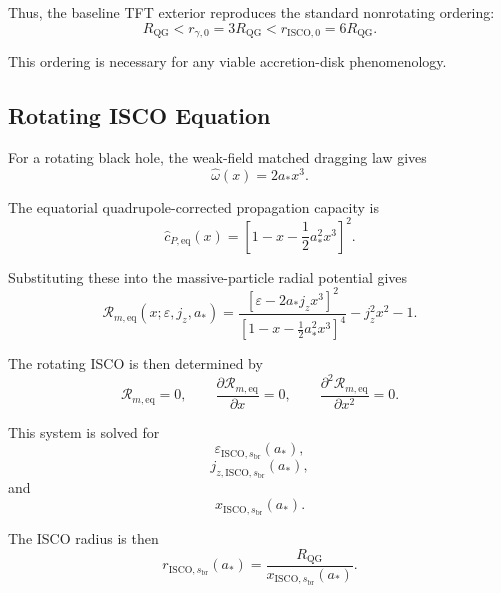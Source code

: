 Thus, the baseline TFT exterior reproduces the standard nonrotating ordering:
\begin{equation}
    \boxed{ R_{\mathrm{QG}} < r_{\gamma,0} = 3R_{\mathrm{QG}} < r_{\mathrm{ISCO},0} = 6R_{\mathrm{QG}}. }
\end{equation}

This ordering is necessary for any viable accretion-disk phenomenology.

\subsection{Rotating ISCO Equation}

For a rotating black hole, the weak-field matched dragging law gives
\begin{equation}
    \widehat{\omega}(x) = 2a_\ast x^3.
\end{equation}

The equatorial quadrupole-corrected propagation capacity is
\begin{equation}
    \widehat{c}_{P,\mathrm{eq}}(x) = \left[ 1 - x - \frac{1}{2}a_\ast^2x^3 \right]^2.
\end{equation}

Substituting these into the massive-particle radial potential gives
\begin{equation}
    \boxed{ \mathcal{R}_{m,\mathrm{eq}}(x;\varepsilon,j_z,a_\ast) = \frac{ \left[ \varepsilon - 2a_\ast j_z x^3 \right]^2 }{ \left[ 1 - x - \frac{1}{2}a_\ast^2x^3 \right]^4 } - j_z^2x^2 - 1. }
\end{equation}

The rotating ISCO is then determined by
\begin{equation}
    \boxed{ \mathcal{R}_{m,\mathrm{eq}} = 0, \qquad \frac{\partial\mathcal{R}_{m,\mathrm{eq}}}{\partial x} = 0, \qquad \frac{\partial^2\mathcal{R}_{m,\mathrm{eq}}}{\partial x^2} = 0. }
\end{equation}

This system is solved for
\begin{equation}
    \varepsilon_{\mathrm{ISCO},s_{\mathrm{br}}}(a_\ast),
\end{equation}
\begin{equation}
    j_{z,\mathrm{ISCO},s_{\mathrm{br}}}(a_\ast),
\end{equation}
and
\begin{equation}
    x_{\mathrm{ISCO},s_{\mathrm{br}}}(a_\ast).
\end{equation}

The ISCO radius is then
\begin{equation}
    \boxed{ r_{\mathrm{ISCO},s_{\mathrm{br}}}(a_\ast) = \frac{R_{\mathrm{QG}}}{x_{\mathrm{ISCO},s_{\mathrm{br}}}(a_\ast)}. }
\end{equation}

